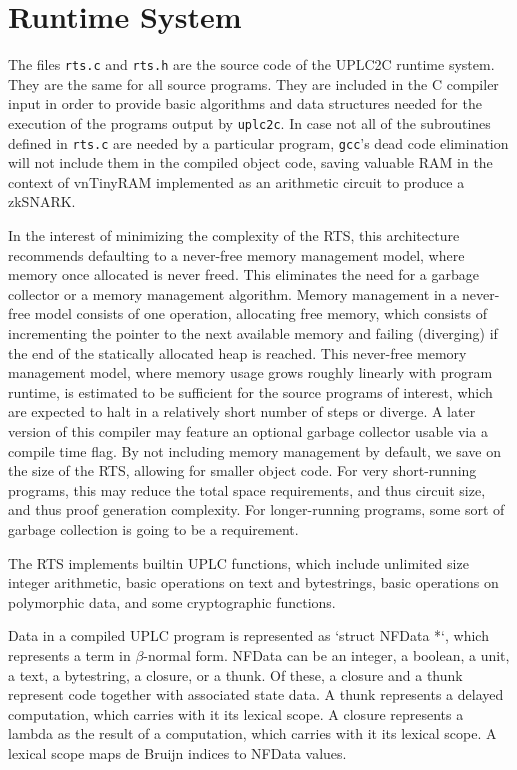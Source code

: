 \documentclass[12pt]{article}
\begin{document}
\section{Runtime System}

The files \texttt{rts.c} and \texttt{rts.h} are the source code of the UPLC2C runtime system. They are the same for all source programs. They are included in the C compiler input in order to provide basic algorithms and data structures needed for the execution of the programs output by \texttt{uplc2c}. In case not all of the subroutines defined in \texttt{rts.c} are needed by a particular program, \texttt{gcc}'s dead code elimination will not include them in the compiled object code, saving valuable RAM in the context of vnTinyRAM implemented as an arithmetic circuit to produce a zkSNARK.

In the interest of minimizing the complexity of the RTS, this architecture recommends defaulting to a never-free memory management model, where memory once allocated is never freed. This eliminates the need for a garbage collector or a memory management algorithm. Memory management in a never-free model consists of one operation, allocating free memory, which consists of incrementing the pointer to the next available memory and failing (diverging) if the end of the statically allocated heap is reached. This never-free memory management model, where memory usage grows roughly linearly with program runtime, is estimated to be sufficient for the source programs of interest, which are expected to halt in a relatively short number of steps or diverge. A later version of this compiler may feature an optional garbage collector usable via a compile time flag. By not including memory management by default, we save on the size of the RTS, allowing for smaller object code. For very short-running programs, this may reduce the total space requirements, and thus circuit size, and thus proof generation complexity. For longer-running programs, some sort of garbage collection is going to be a requirement.

The RTS implements builtin UPLC functions, which include unlimited size integer arithmetic, basic operations on text and bytestrings, basic operations on polymorphic data, and some cryptographic functions.

Data in a compiled UPLC program is represented as `struct NFData *`, which represents a term in $\beta$-normal form. NFData can be an integer, a boolean, a unit, a text, a bytestring, a closure, or a thunk. Of these, a closure and a thunk represent code together with associated state data. A thunk represents a delayed computation, which carries with it its lexical scope. A closure represents a lambda as the result of a computation, which carries with it its lexical scope. A lexical scope maps de Bruijn indices to NFData values.
\end{document}
